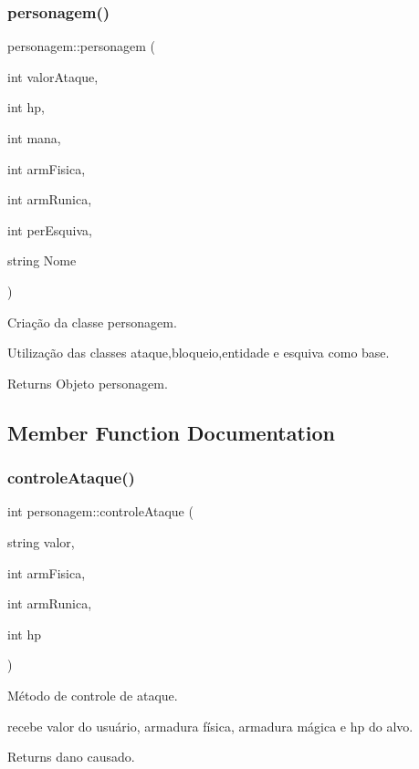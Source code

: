 \subsubsection{\texorpdfstring{personagem()}{personagem()}}
{\footnotesize\ttfamily personagem\+::personagem (\begin{DoxyParamCaption}\item[{int}]{valor\+Ataque,  }\item[{int}]{hp,  }\item[{int}]{mana,  }\item[{int}]{arm\+Fisica,  }\item[{int}]{arm\+Runica,  }\item[{int}]{per\+Esquiva,  }\item[{string}]{Nome }\end{DoxyParamCaption})}



Criação da classe personagem. 

Utilização das classes ataque,bloqueio,entidade e esquiva como base. \begin{DoxyReturn}{Returns}
Objeto personagem. 
\end{DoxyReturn}


\subsection{Member Function Documentation}
\mbox{\label{classpersonagem_a31e7891af5a68142e7dc693d894069f1}} 
\subsubsection{\texorpdfstring{controle\+Ataque()}{controleAtaque()}}
{\footnotesize\ttfamily int personagem\+::controle\+Ataque (\begin{DoxyParamCaption}\item[{string}]{valor,  }\item[{int}]{arm\+Fisica,  }\item[{int}]{arm\+Runica,  }\item[{int}]{hp }\end{DoxyParamCaption})}



Método de controle de ataque. 

recebe valor do usuário, armadura física, armadura mágica e hp do alvo. \begin{DoxyReturn}{Returns}
dano causado. 
\end{DoxyReturn}
\mbox{\label{classpersonagem_ae0c22f0be89d748e1b9c4752b704e80a}} 
